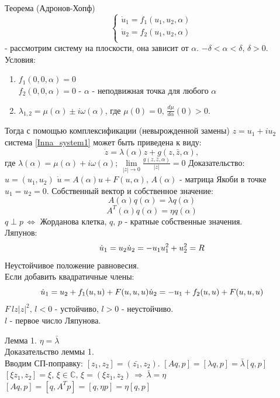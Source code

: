 Теорема (Адронов-Хопф)
$$
\begin{cases} \label{Inna_system1}
	\dot{u}_1 = f_1(u_1, u_2, \alpha) \\
	\dot{u}_2 = f_2(u_1, u_2, \alpha) \\	
\end{cases}
$$	
- рассмотрим систему на плоскости, она зависит от $\alpha$. $-\delta < \alpha < \delta, \, \delta > 0.$ \\
Условия: 
\begin{enumerate}
	\item $f_1(0,0,\alpha) = 0$ \\
	$f_2(0,0,\alpha) = 0$
	- $\alpha$ - неподвижная точка для любого $\alpha$ 
	\item $\lambda_{1,2} = \mu(\alpha) \pm i \omega(\alpha)$, где $\mu(0)= 0$, $\frac{d\mu}{d\alpha}(0) > 0$.
\end{enumerate}
Тогда с помощью  комплексификации (невырожденной замены) $z = u_1 + i u_2$ система \ref{Inna_system1} может быть приведена к виду: \\
\[
\dot{z} = \lambda(\alpha)z + g(z, \bar{z}, \alpha),
\] 
где $\lambda(\alpha) = \mu(\alpha) + i\omega(\alpha)$;
$\lim\limits_{|z|\to 0}\frac{g(z, \bar{z}, \alpha)}{|z|}= 0$
Доказательство: \\
$u = (u_1, u_2)$
$\dot{u} = A(\alpha) u + F(u, \alpha), \, A(\alpha)$ - матрица Якоби в точке $u_1 = u_2 = 0$.
Собственный вектор и собственное значение:
\[\label{Inna_1}
	A(\alpha) q(\alpha) = \lambda q(\alpha) 
\]
\[\label{Inna_2}
A^T(\alpha) q(\alpha) = \eta q(\alpha) 
\]
$q \perp p \, \Leftrightarrow $ Жорданова клетка, $q,\,p$ - кратные собственные значения.\\

Ляпунов: \\
\[ 
\dot{u}_1 = u_2\\
\dot{u}_2 = -u_1\\
u_1^2 + u_2^2 = R\\
\]
Неустойчивое положение равновесия.\\
Если добавить квадратичные члены: 
\[
	\dot{u}_1 = u_2 + f_1(u,u) + F(u,u,u) \\
	\dot{u}_2 = -u_1 + f_2(u,u) + F(u,u,u) \\
\]
$F ~ lz|z|^2, \, l<0$ - устойчиво, $l>0$ - неустойчиво. \\
$l$ - первое число Ляпунова. 

Лемма 1.
$\eta = \bar{\lambda}$\\
Доказательство леммы 1.\\
Вводим СП-поправку: $[z_1, z_2] = (\bar{z_1},z_2)$.
$[Aq,p] = [\lambda q, p] = \bar{\lambda}[q,p]$\\
$[\xi z_1,z_2] = \xi, \, \xi \in \mathbb{C}, \, \xi = (\xi z_1, z_2) \, \Rightarrow \, \bar{\lambda} = \eta$ \\
$[Aq,p] = [q, A^Tp] = [q,\eta p] = \eta [q,p]$\\

